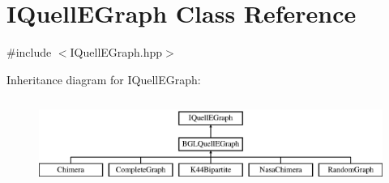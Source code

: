 \hypertarget{a00076}{}\section{I\+Quell\+E\+Graph Class Reference}
\label{a00076}


{\ttfamily \#include $<$I\+Quell\+E\+Graph.\+hpp$>$}

Inheritance diagram for I\+Quell\+E\+Graph\+:\begin{figure}[H]
\begin{center}
\leavevmode
\includegraphics[height=2.871795cm]{a00076}
\end{center}
\end{figure}
